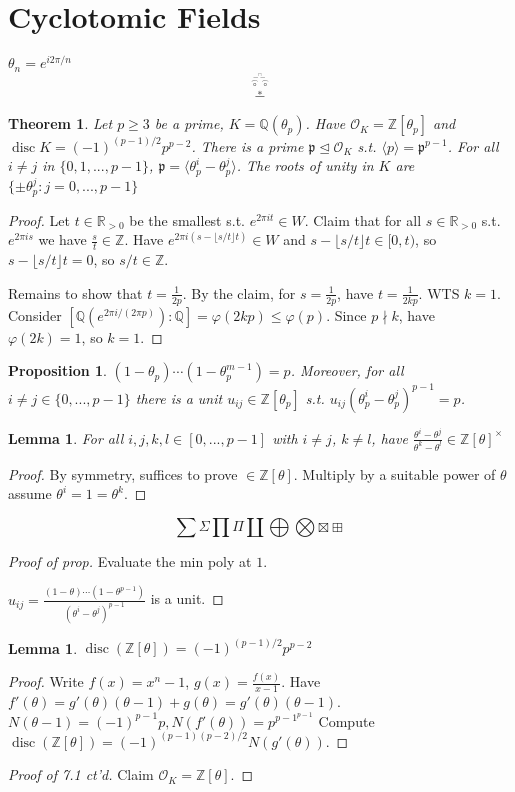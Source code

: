 \documentclass{article}
\theoremstyle{definition}
\theoremstyle{remark}
\theoremstyle{plain}
\newtheorem{lem}[defn]{Lemma}
\newtheorem{thm}[defn]{Theorem}
\newtheorem{prop}[defn]{Proposition}
\newcommand{\ZZ}{\mathbb{Z}}
\newcommand{\QQ}{\mathbb{Q}}
\newcommand{\RR}{\mathbb{R}}
\newcommand{\disc}{\operatorname{disc}}
\begin{document}
\section{Cyclotomic Fields}
$\theta_n=e^{i2\pi/n}$
\[\overset{\overset{\overset{\sqcap}{--}}{\overset{\smallfrown}{\circ}\overset{\smallfrown}{\circ}}}{\overset{*}{-}}\tag{Owen's emoji}\]
\begin{thm}
    Let $p\ge 3$ be a prime, $K=\QQ(\theta_p)$. Have $\mathcal O_K=\ZZ[\theta_p]$ and $\disc K=(-1)^{(p-1)/2}p^{p-2}$. There is a prime $\mathfrak p\trianglelefteq\mathcal O_K$ s.t. $\langle p\rangle=\mathfrak p^{p-1}$. For all $i\neq j$ in $\{0,1,...,p-1\}$, $\mathfrak p=\langle \theta_p^i-\theta_p^j\rangle$. The roots of unity in $K$ are $\{\pm\theta_p^j:j=0,...,p-1\}$
\end{thm}
\begin{proof}
    Let $t\in\RR_{>0}$ be the smallest s.t. $e^{2\pi i t}\in W$. Claim that for all $s\in\RR_{>0}$ s.t. $e^{2\pi i s}$ we have $\frac{s}{t}\in\ZZ$. Have $e^{2\pi i(s-\lfloor s/t\rfloor t)}\in W$ and $s-\lfloor s/t\rfloor t\in[0,t)$, so $s-\lfloor s/t\rfloor t=0$, so $s/t\in\ZZ$. 
    
    Remains to show that $t=\frac{1}{2p}$. By the claim, for $s=\frac{1}{2p}$, have $t=\frac{1}{2kp}$. WTS $k=1$. Consider $[\QQ(e^{2\pi i/(2\pi p)}):\QQ]=\varphi(2kp)\le \varphi(p)$. Since $p\nmid k$, have $\varphi(2k)=1$, so $k=1$.
\end{proof}
\begin{prop}
    $(1-\theta_p)\cdots(1-\theta_p^{m-1})=p$. Moreover, for all $i\neq j\in\{0,...,p-1\}$ there is a unit $u_{ij}\in\ZZ[\theta_p]$ s.t. $u_{ij}(\theta_p^i-\theta_p^j)^{p-1}=p$.
\end{prop}
\begin{lem}
    For all $i,j,k,l\in[0,...,p-1]$ with $i\neq j$, $k\neq l$, have $\frac{\theta^i-\theta^j}{\theta^k-\theta^l}\in\ZZ[\theta]^\times$
\end{lem}
\begin{proof}
    By symmetry, suffices to prove $\in\ZZ[\theta]$. Multiply by a suitable power of $\theta$ assume $\theta^i=1=\theta^k$.
\end{proof}
\[\sum\Sigma\prod\Pi\coprod\bigoplus\bigotimes\boxtimes\boxplus\]
\begin{proof}[Proof of prop]
    Evaluate the min poly at $1$.

    $u_{ij}=\frac{(1-\theta)\cdots(1-\theta^{p-1})}{(\theta^i-\theta^j)^{p-1}}$ is a unit.
\end{proof}
\begin{lem}
    $\disc(\ZZ[\theta])=(-1)^{(p-1)/2}p^{p-2}$
\end{lem}
\begin{proof}
    Write $f(x)=x^n-1$, $g(x)=\frac{f(x)}{x-1}$.
    Have $f'(\theta)=g'(\theta)(\theta-1)+g(\theta)=g'(\theta)(\theta-1)$. $N(\theta-1)=(-1)^{p-1}p, N(f'(\theta))=p^{p-1^{p-1}}$
    Compute $\disc(\ZZ[\theta])=(-1)^{(p-1)(p-2)/2}N(g'(\theta))$.
\end{proof}
\begin{proof}[Proof of 7.1 ct'd]
    Claim $\mathcal O_K=\ZZ[\theta]$.
\end{proof}
\end{document}

